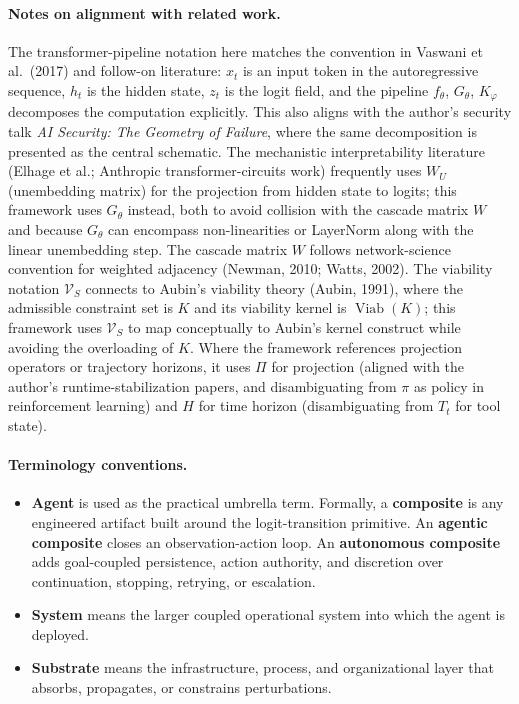 \documentclass[11pt]{article}
\DeclareMathOperator{\Viab}{Viab}
\begin{document}
\paragraph{Notes on alignment with related work.} The transformer-pipeline notation here matches the convention in Vaswani et al.\ (2017) and follow-on literature: $x_t$ is an input token in the autoregressive sequence, $h_t$ is the hidden state, $z_t$ is the logit field, and the pipeline $f_\theta$, $G_\theta$, $K_\varphi$ decomposes the computation explicitly. This also aligns with the author's security talk \emph{AI Security: The Geometry of Failure}, where the same decomposition is presented as the central schematic. The mechanistic interpretability literature (Elhage et al.; Anthropic transformer-circuits work) frequently uses $W_U$ (unembedding matrix) for the projection from hidden state to logits; this framework uses $G_\theta$ instead, both to avoid collision with the cascade matrix $W$ and because $G_\theta$ can encompass non-linearities or LayerNorm along with the linear unembedding step. The cascade matrix $W$ follows network-science convention for weighted adjacency (Newman, 2010; Watts, 2002). The viability notation $\mathcal{V}_S$ connects to Aubin's viability theory (Aubin, 1991), where the admissible constraint set is $K$ and its viability kernel is $\Viab(K)$; this framework uses $\mathcal{V}_S$ to map conceptually to Aubin's kernel construct while avoiding the overloading of $K$. Where the framework references projection operators or trajectory horizons, it uses $\Pi$ for projection (aligned with the author's runtime-stabilization papers, and disambiguating from $\pi$ as policy in reinforcement learning) and $H$ for time horizon (disambiguating from $T_t$ for tool state).

\paragraph{Terminology conventions.}
\begin{itemize}
\item \textbf{Agent} is used as the practical umbrella term. Formally, a \textbf{composite} is any engineered artifact built around the logit-transition primitive. An \textbf{agentic composite} closes an observation-action loop. An \textbf{autonomous composite} adds goal-coupled persistence, action authority, and discretion over continuation, stopping, retrying, or escalation.
\item \textbf{System} means the larger coupled operational system into which the agent is deployed.
\item \textbf{Substrate} means the infrastructure, process, and organizational layer that absorbs, propagates, or constrains perturbations.
\end{itemize}
\end{document}

